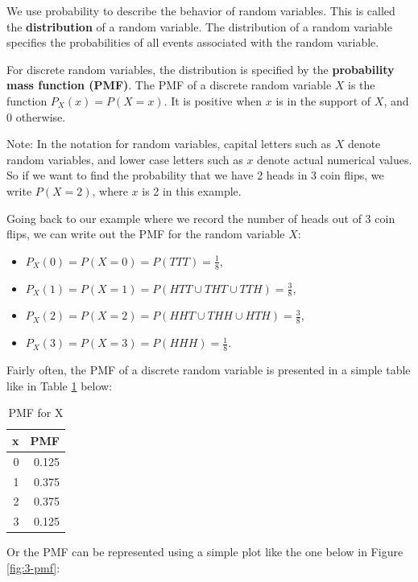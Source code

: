 \documentclass[
]{book}
\providecommand{\tightlist}{%
  \setlength{\itemsep}{0pt}\setlength{\parskip}{0pt}}
\begin{document}
We use probability to describe the behavior of random variables. This is called the \textbf{distribution} of a random variable. The distribution of a random variable specifies the probabilities of all events associated with the random variable.

For discrete random variables, the distribution is specified by the \textbf{probability mass function (PMF)}. The PMF of a discrete random variable \(X\) is the function \(P_X(x) = P(X=x)\). It is positive when \(x\) is in the support of \(X\), and 0 otherwise.

Note: In the notation for random variables, capital letters such as \(X\) denote random variables, and lower case letters such as \(x\) denote actual numerical values. So if we want to find the probability that we have 2 heads in 3 coin flips, we write \(P(X=2)\), where \(x\) is 2 in this example.

Going back to our example where we record the number of heads out of 3 coin flips, we can write out the PMF for the random variable \(X\):

\begin{itemize}
\tightlist
\item
  \(P_X(0) = P(X=0) = P(TTT) = \frac{1}{8}\),
\item
  \(P_X(1) = P(X=1) = P(HTT \cup THT \cup TTH) = \frac{3}{8}\),
\item
  \(P_X(2) = P(X=2) = P(HHT \cup THH \cup HTH) = \frac{3}{8}\),
\item
  \(P_X(3) = P(X=3) = P(HHH) = \frac{1}{8}\).
\end{itemize}

Fairly often, the PMF of a discrete random variable is presented in a simple table like in Table \ref{tab:3-pmf-tab} below:

\begin{table}

\caption{\label{tab:3-pmf-tab}PMF for X}
\centering
\begin{tabular}[t]{r|r}
\hline
x & PMF\\
\hline
0 & 0.125\\
\hline
1 & 0.375\\
\hline
2 & 0.375\\
\hline
3 & 0.125\\
\hline
\end{tabular}
\end{table}

Or the PMF can be represented using a simple plot like the one below in Figure \ref{fig:3-pmf}:
\end{document}
